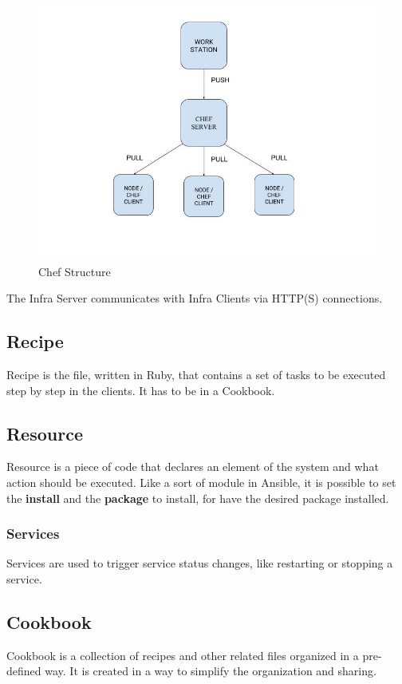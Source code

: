 \documentclass[12pt,a4paper,openright,twoside]{book}
\begin{document}
\begin{figure}[h]
    \centering
    \includegraphics[width=.8\linewidth]{figures/img_Chef_structure.jpeg}
    \caption{Chef Structure}
    \label{fig:chef-structure-image}
\end{figure}

The Infra Server communicates with Infra Clients via HTTP(S) connections.

\subsection{Recipe}
Recipe is the file, written in Ruby, that contains a set of tasks to be executed step by step in the clients. It has to be in a Cookbook.

\subsection{Resource}
Resource is a piece of code that declares an element of the system and what action should be executed.
Like a sort of module in Ansible, it is possible to set the \textbf{install} and the \textbf{package} to install, for have the desired package installed.

\subsubsection{Services}
Services are used to trigger service status changes, like restarting or stopping a service.

\subsection{Cookbook}
Cookbook is a collection of recipes and other related files organized in a pre-defined way. It is created in a way to simplify the organization and sharing.
\end{document}
